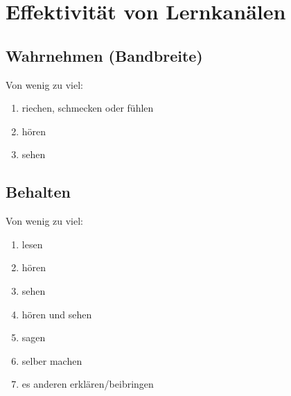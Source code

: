 \section{Effektivität von Lernkanälen}
\subsection{Wahrnehmen (Bandbreite)}
Von wenig zu viel:
\begin{enumerate}
  \item riechen, schmecken oder fühlen
  \item hören
  \item sehen
\end{enumerate}

\subsection{Behalten}
Von wenig zu viel:
\begin{enumerate}
  \item lesen
  \item hören
  \item sehen
  \item hören und sehen
  \item sagen
  \item selber machen
  \item es anderen erklären/beibringen
\end{enumerate}

